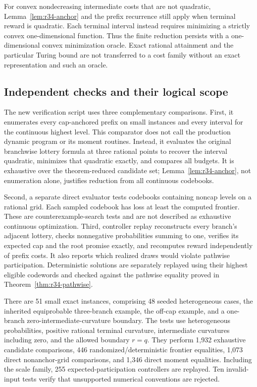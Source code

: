 For convex nondecreasing intermediate costs that are not quadratic, Lemma~\ref{lem:r34-anchor} and the prefix recurrence still apply when terminal reward is quadratic. Each terminal interval instead requires minimizing a strictly convex one-dimensional function. Thus the finite reduction persists with a one-dimensional convex minimization oracle. Exact rational attainment and the particular Turing bound are not transferred to a cost family without an exact representation and such an oracle.

\subsection{Independent checks and their logical scope}
The new verification script uses three complementary comparisons. First, it enumerates every cap-anchored prefix on small instances and every interval for the continuous highest level. This comparator does not call the production dynamic program or its moment routines. Instead, it evaluates the original branchwise lottery formula at three rational points to recover the interval quadratic, minimizes that quadratic exactly, and compares all budgets. It is exhaustive over the theorem-reduced candidate set; Lemma~\ref{lem:r34-anchor}, not enumeration alone, justifies reduction from all continuous codebooks.

Second, a separate direct evaluator tests codebooks containing noncap levels on a rational grid. Each sampled codebook has loss at least the computed frontier. These are counterexample-search tests and are not described as exhaustive continuous optimization. Third, controller replay reconstructs every branch's adjacent lottery, checks nonnegative probabilities summing to one, verifies its expected cap and the root promise exactly, and recomputes reward independently of prefix costs. It also reports which realized draws would violate pathwise participation. Deterministic solutions are separately replayed using their highest eligible codewords and checked against the pathwise equality proved in Theorem~\ref{thm:r34-pathwise}.

There are 51 small exact instances, comprising 48 seeded heterogeneous cases, the inherited equiprobable three-branch example, the off-cap example, and a one-branch zero-intermediate-curvature boundary. The tests use heterogeneous probabilities, positive rational terminal curvature, intermediate curvatures including zero, and the allowed boundary $r=q$. They perform 1,932 exhaustive candidate comparisons, 446 randomized/deterministic frontier equalities, 1,073 direct nonanchor-grid comparisons, and 1,346 direct moment equalities. Including the scale family, 255 expected-participation controllers are replayed. Ten invalid-input tests verify that unsupported numerical conventions are rejected.

